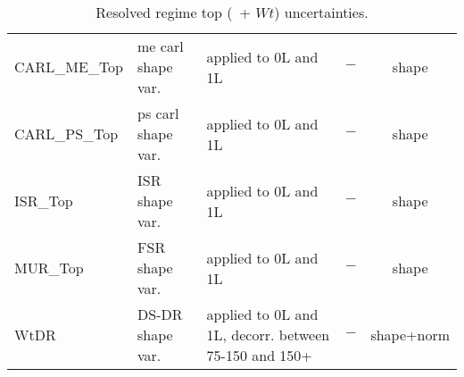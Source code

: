 \begin{table}[!htpb]
\begin{center}
{\begin{tabular}{ l l | l | c | c  }
    \hline
    CARL\_ME\_Top & \gls{me} \gls{carl} shape var.   & applied to 0L and 1L & $-$ & shape \\
    CARL\_PS\_Top & \gls{ps} \gls{carl} shape var.   & applied to 0L and 1L & $-$ & shape \\
    ISR\_Top   & ISR shape var.  & applied to 0L and 1L & $-$ & shape \\
    MUR\_Top   & FSR shape var.  & applied to 0L and 1L & $-$ & shape \\
    WtDR & DS-DR shape var. & applied to 0L and 1L, decorr. between 75-150 and 150+ & $-$ & shape+norm \\
    \hline
    \hline
    \end{tabular}} 
    \caption{Resolved regime top (\ttb\ + $Wt$) uncertainties.}
    \label{tab:top_summary}
    \end{center}
\end{table}
